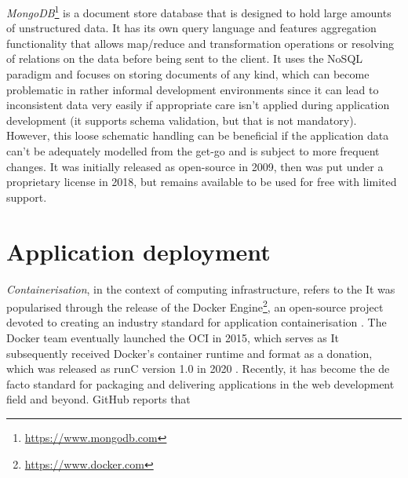 \emph{MongoDB}\footnote{\url{https://www.mongodb.com}} is a document store database that is designed to hold large amounts of unstructured data. It has its own query language and features aggregation functionality that allows map/reduce and transformation operations or resolving of relations on the data before being sent to the client. It uses the \ac{NoSQL} paradigm and focuses on storing documents of any kind, which can become problematic in rather informal development environments since it can lead to inconsistent data very easily if appropriate care isn't applied during application development (it supports schema validation, but that is not mandatory). However, this loose schematic handling can be beneficial if the application data can't be adequately modelled from the get-go and is subject to more frequent changes. It was initially released as open-source in 2009, then was put under a proprietary license in 2018, but remains available to be used for free with limited support.


\section{Application deployment}

\emph{Containerisation}, in the context of computing infrastructure, refers to the  It was popularised through the release of the Docker Engine\footnote{\url{https://www.docker.com}}, an open-source project devoted to creating an industry standard for application containerisation \parencite{dockerRelease}. The Docker team eventually launched the \ac{OCI} in 2015, which serves as  It subsequently received Docker's container runtime and format as a donation, which was released as runC version 1.0 in 2020 \parencite{openContainerInitiative}. Recently, it has become the de facto standard for packaging and delivering applications in the web development field and beyond. GitHub reports that 


